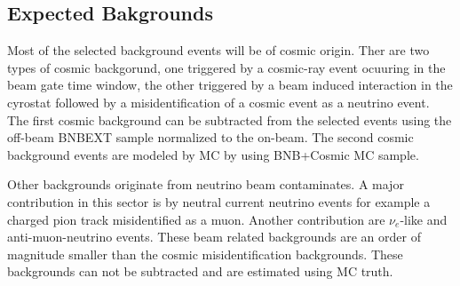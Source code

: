 \begin{table}[!htp] \centering 
  \caption{Passing rates for Selection I selection applied to on-beam and off-beam data. THe numbers in brackets give the passing rate wrt the step before (first percentage) and wrt the generated events (second percentage). Off-beam data has been scaled with a factor 1.23 to normalize to the on-beam data stream.} 
  \label{table:data} 
\small 
{} 
\end{table} 
\subsection{Expected Bakgrounds}
Most of the selected background events will be of cosmic origin. Ther are two types of cosmic backgorund, one triggered by a cosmic-ray event ocuuring in the beam gate time window, the other triggered by a beam induced interaction in the cyrostat followed by a misidentification of a cosmic event as a neutrino event. The first cosmic background can be subtracted from the selected events using the off-beam BNBEXT sample normalized to the on-beam. The second cosmic background events are modeled by MC by using BNB+Cosmic MC sample. 

Other backgrounds originate from neutrino beam contaminates. A major contribution in this sector is by neutral current neutrino events for example a charged pion track misidentified as a muon. Another contribution are $\nu_e$-like and anti-muon-neutrino events. These beam related backgrounds are an order of magnitude smaller than the cosmic misidentification backgrounds. These backgrounds can not be subtracted and are estimated using MC truth.

